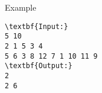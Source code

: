 Example
\begin{verbatim}
\textbf{Input:}
5 10
2 1 5 3 4
5 6 3 8 12 7 1 10 11 9
\textbf{Output:}
2
2 6\end{verbatim}